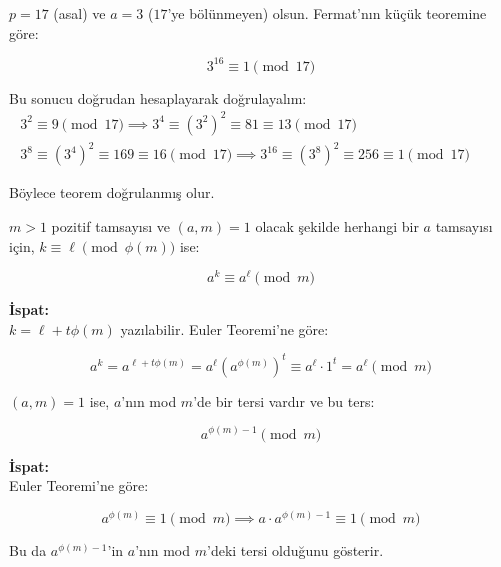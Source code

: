 \documentclass[12pt]{article}
\begin{document}
\vspace{2em}

\begin{tcolorbox}[colback=red!5, colframe=red!50!black, title=\textbf{Örnek 1.26: Fermat'nın Küçük Teoremi Uygulaması}, fonttitle=\bfseries, sharp corners]
$p = 17$ (asal) ve $a = 3$ ($17$'ye bölünmeyen) olsun. Fermat'nın küçük teoremine göre:

\[
3^{16} \equiv 1 \pmod{17}
\]

Bu sonucu doğrudan hesaplayarak doğrulayalım:
\begin{eqnarray*}
3^2 \equiv 9 \pmod{17} \implies 3^4 \equiv (3^2)^2 \equiv 81 \equiv 13 \pmod{17}
&&\text{ } \\
3^8 \equiv (3^4)^2 \equiv 169 \equiv 16 \pmod{17} \implies 3^{16} \equiv (3^8)^2 \equiv 256 \equiv 1 \pmod{17}
\end{eqnarray*}

Böylece teorem doğrulanmış olur.
\end{tcolorbox}

\vspace{2em}

\begin{tcolorbox}[colback=green!5, colframe=green!50!black, title=\textbf{Sonuç 1.27: Euler-Fermat Genellemesi}, fonttitle=\bfseries, sharp corners]
$m > 1$ pozitif tamsayısı ve $(a,m) = 1$ olacak şekilde herhangi bir $a$ tamsayısı için, $k \equiv \ell \pmod{\phi(m)}$ ise:

\[
a^k \equiv a^\ell \pmod{m}
\]

\textbf{İspat:} \\
$k = \ell + t\phi(m)$ yazılabilir. Euler Teoremi'ne göre:

\[
a^k = a^{\ell + t\phi(m)} = a^\ell (a^{\phi(m)})^t \equiv a^\ell \cdot 1^t = a^\ell \pmod{m}
\]
\end{tcolorbox}

\vspace{2em}

\begin{tcolorbox}[colback=purple!5, colframe=purple!50!black, title=\textbf{Teorem 1.16: Modüler Tersin Varlığı}, fonttitle=\bfseries, sharp corners]
$(a,m) = 1$ ise, $a$'nın mod $m$'de bir tersi vardır ve bu ters:

\[
a^{\phi(m)-1} \pmod{m}
\]

\textbf{İspat:} \\
Euler Teoremi'ne göre:

\[
a^{\phi(m)} \equiv 1 \pmod{m} \implies a \cdot a^{\phi(m)-1} \equiv 1 \pmod{m}
\]

Bu da $a^{\phi(m)-1}$'in $a$'nın mod $m$'deki tersi olduğunu gösterir.
\end{tcolorbox}
\end{document}
